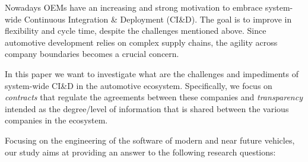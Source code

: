 Nowadays OEMs have an increasing and strong motivation
to embrace system-wide Continuous Integration \& Deployment (CI\&D). The goal is to improve
in flexibility and cycle time, despite the challenges mentioned above. 
Since automotive development relies on complex supply chains, the agility across company boundaries becomes a crucial concern.

In this paper we want to investigate %
what are the challenges and impediments of system-wide CI\&D in the automotive ecosystem. 
Specifically, we focus on {\em contracts} that regulate the agreements between these companies 
and {\em transparency} intended as the degree/level of information that is shared between the various companies in the ecosystem. 

Focusing on the engineering of the software of modern and near future vehicles, our study aims at providing an answer to the following research questions:

%

